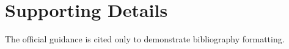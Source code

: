 \section{Supporting Details}\label{app:supporting}
The official guidance \cite{formatguide} is cited only to demonstrate bibliography formatting.
